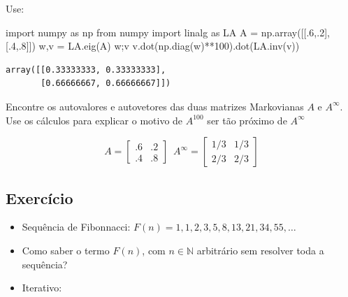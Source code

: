 \documentclass[
  letterpaper,
  DIV=11,
  numbers=noendperiod]{scrartcl}
\newenvironment{Shaded}{\begin{snugshade}}{\end{snugshade}}
\newcommand{\DecValTok}[1]{\textcolor[rgb]{0.68,0.00,0.00}{#1}}
\newcommand{\FloatTok}[1]{\textcolor[rgb]{0.68,0.00,0.00}{#1}}
\newcommand{\ImportTok}[1]{\textcolor[rgb]{0.00,0.46,0.62}{#1}}
\newcommand{\NormalTok}[1]{\textcolor[rgb]{0.00,0.23,0.31}{#1}}
\newcommand{\OperatorTok}[1]{\textcolor[rgb]{0.37,0.37,0.37}{#1}}
\begin{document}
Use:

\begin{Shaded}
\begin{Highlighting}[]
\ImportTok{import}\NormalTok{ numpy }\ImportTok{as}\NormalTok{ np}
\ImportTok{from}\NormalTok{ numpy }\ImportTok{import}\NormalTok{ linalg }\ImportTok{as}\NormalTok{ LA}
\NormalTok{A }\OperatorTok{=}\NormalTok{ np.array([[}\FloatTok{.6}\NormalTok{,}\FloatTok{.2}\NormalTok{],[}\FloatTok{.4}\NormalTok{,}\FloatTok{.8}\NormalTok{]])}
\NormalTok{w,v }\OperatorTok{=}\NormalTok{ LA.eig(A)}
\NormalTok{w}\OperatorTok{;}\NormalTok{v}
\NormalTok{v.dot(np.diag(w)}\OperatorTok{**}\DecValTok{100}\NormalTok{).dot(LA.inv(v))}
\end{Highlighting}
\end{Shaded}

\begin{verbatim}
array([[0.33333333, 0.33333333],
       [0.66666667, 0.66666667]])
\end{verbatim}

\begin{tcolorbox}[enhanced jigsaw, arc=.35mm, opacityback=0, bottomtitle=1mm, left=2mm, coltitle=black, rightrule=.15mm, colbacktitle=quarto-callout-note-color!10!white, breakable, opacitybacktitle=0.6, bottomrule=.15mm, title=\textcolor{quarto-callout-note-color}{\faInfo}\hspace{0.5em}{Note}, titlerule=0mm, colframe=quarto-callout-note-color-frame, toprule=.15mm, toptitle=1mm, leftrule=.75mm, colback=white]
Encontre os autovalores e autovetores das duas matrizes Markovianas
\(A\) e \(A^\infty\). Use os cálculos para explicar o motivo de
\(A^{100}\) ser tão próximo de \(A^\infty\)

\[ A = \begin{bmatrix}.6 & .2 \\ .4 & .8\end{bmatrix} \,\,\,A^\infty=\begin{bmatrix}1/3 & 1/3 \\ 2/3 & 2/3\end{bmatrix}\]
\end{tcolorbox}

\hypertarget{exercuxedcio-1}{%
\subsection{Exercício}\label{exercuxedcio-1}}

\begin{itemize}
\item
  Sequência de Fibonnacci:
  \(F(n) = 1, 1, 2, 3, 5, 8, 13, 21, 34, 55, \ldots\)
\item
  Como saber o termo \(F(n)\), com \(n\in \mathbb N\) arbitrário sem
  resolver toda a sequência?
\item
  Iterativo:
\end{itemize}
\end{document}
